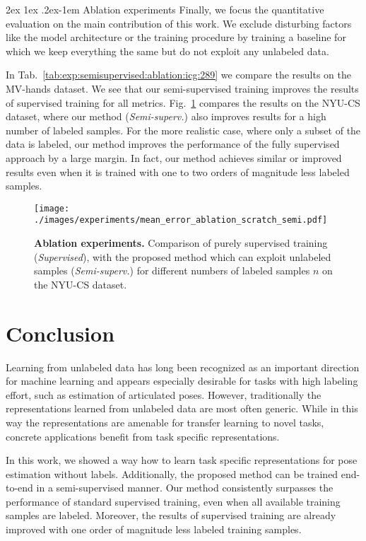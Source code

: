 \documentclass[10pt,twocolumn,letterpaper]{article}
\makeatletter
\renewcommand{\paragraph}{%
  \@startsection{paragraph}{4}%
  {\z@}{2ex \@plus 1ex \@minus .2ex}{-1em}%
  {\normalfont\normalsize\bfseries}%
}
\makeatother
\begin{document}
\paragraph{Ablation experiments}
Finally, we focus the quantitative evaluation on the main contribution of this work.
We exclude disturbing factors like the model architecture 
or the training procedure
by training a baseline for which we keep everything the same 
but do not exploit any unlabeled data.

In Tab.~\ref{tab:exp:semisupervised:ablation:icg:289} we compare the results on the MV-hands dataset.
We see that our semi-supervised training 
improves the results of supervised training for all metrics.
Fig.~\ref{fig:exp:semisupervised:ablation:nyu} compares the results on the NYU-CS dataset,
where our method (\emph{Semi-superv.}) also
improves results for a high number of labeled samples.
For the more realistic case, where only a subset of the data is labeled, 
our method improves the performance of the fully supervised approach by a large margin.
In fact, our method achieves similar or improved results 
even when it is trained with one to two orders of magnitude less labeled samples.

\begin{figure}[t]
  \centering
  \texttt{[image: ./images/experiments/mean\_error\_ablation\_scratch\_semi.pdf]}
  \caption[]{\textbf{Ablation experiments.}
  Comparison of purely supervised training (\emph{Supervised}), 
  with the proposed method which can exploit unlabeled samples (\emph{Semi-superv.})
  for different numbers of labeled samples $n$ on the NYU-CS dataset.
  }
  \label{fig:exp:semisupervised:ablation:nyu}
\end{figure}

\section{Conclusion}
Learning from unlabeled data has long been recognized as an important direction for 
machine learning and appears especially desirable for tasks with high labeling effort, 
such as estimation of articulated poses.
However, traditionally the representations learned from unlabeled data are most often generic.
While in this way the representations are amenable for transfer learning to novel tasks,
concrete applications benefit from task specific representations. 

In this work, we showed a way how to learn task specific representations
for pose estimation without labels.
Additionally, the proposed method can be trained end-to-end in a semi-supervised manner.
Our method consistently surpasses the performance of standard supervised training, 
even when all available training samples are labeled.
Moreover, the results of supervised training are already improved with 
one order of magnitude less labeled training samples.
\end{document}
